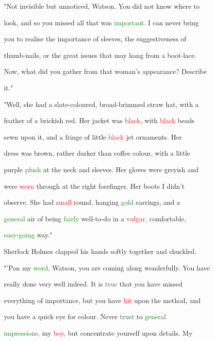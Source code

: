  "Not invisible but unnoticed, Watson. You did not know where to

 look, and so you missed all that was \textcolor{green}{important.} I can never bring

 you to realise the \textcolor{BurntOrange}{importance} of sleeves, the suggestiveness of

 thumb-nails, or the great issues that may hang from a boot-lace.

 Now, what did you gather from that woman's appearance? Describe

 it."



 "Well, she had a slate-coloured, broad-brimmed straw hat, with a

 feather of a brickish red. Her jacket was \textcolor{red}{black,} with \textcolor{red}{black} beads

 sewn upon it, and a fringe of little \textcolor{red}{black} jet ornaments. Her

 dress was brown, rather darker than coffee colour, with a little

 purple \textcolor{green}{plush} at the neck and sleeves. Her gloves were greyish and

 were \textcolor{red}{worn} through at the right forefinger. Her boots I didn't

 observe. She had \textcolor{red}{small} round, hanging \textcolor{green}{gold} earrings, and a

 \textcolor{green}{general} air of being \textcolor{green}{fairly} well-to-do in a \textcolor{red}{vulgar,} comfortable,

 \textcolor{green}{easy-going} way."



 Sherlock Holmes clapped his hands softly together and \textcolor{BurntOrange}{chuckled.}



 "'Pon my \textcolor{green}{word,} Watson, you are coming along \textcolor{BurntOrange}{wonderfully.} You have

 really done very well indeed. It is \textcolor{green}{true} that you have missed

 everything of \textcolor{BurntOrange}{importance,} but you have \textcolor{red}{hit} upon the method, and

 you have a quick eye for colour. Never \textcolor{green}{trust} to \textcolor{green}{general}

 \textcolor{green}{impressions,} my \textcolor{red}{boy,} but concentrate yourself upon details. My

